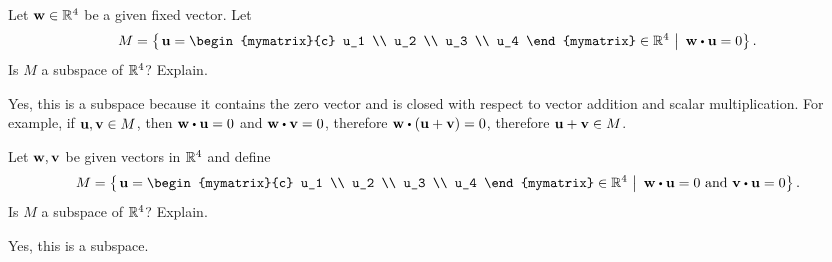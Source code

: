 \begin{ex}
  Let $\vect{w}\in \R^4$ be a given fixed vector. Let
  \begin{equation*}
    M=\set{\left.\vect{u}
        =\begin{mymatrix}{c}
          u_1 \\ u_2 \\ u_3 \\ u_4
        \end{mymatrix} \in \R^4~\right\vert~ \vect{w}\dotprod \vect{u}
      =0}.
  \end{equation*}
  Is $M$ a subspace of $\mathbb{R}^4$? Explain.
  \begin{sol}
    Yes, this is a subspace because it contains the zero vector and is
    closed with respect to vector addition and scalar
    multiplication. For example, if $\vect{u},\vect{v}\in M$, then
    $\vect{w}\dotprod\vect{u}=0$ and $\vect{w}\dotprod\vect{v}=0$,
    therefore $\vect{w}\dotprod(\vect{u}+\vect{v})=0$, therefore
    $\vect{u}+\vect{v}\in M$.
  \end{sol}
\end{ex}

\begin{ex}
  Let $\vect{w},\vect{v}$ be given vectors in $\mathbb{R}^4$ and define
  \begin{equation*}
    M=\set{\left.\vect{u}=\begin{mymatrix}{c}
        u_1 \\ u_2 \\ u_3 \\ u_4
      \end{mymatrix} \in \R^4
      ~\right\vert~
    \vect{w}\dotprod \vect{u}=0\text{ and }\vect{v}\dotprod \vect{u}=0}.
  \end{equation*}
  Is $M$ a subspace of $\mathbb{R}^4$? Explain.
  \begin{sol}
    Yes, this is a subspace.
  \end{sol}
\end{ex}

